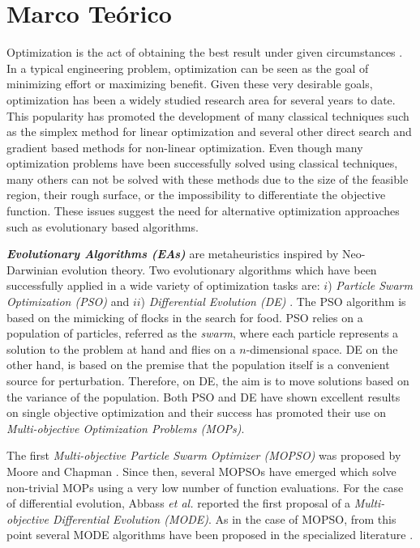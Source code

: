 \chapter{Marco Teórico}

Optimization is the act of obtaining the best result under given circumstances \cite{Rao2009}. In a typical engineering problem, optimization can be seen as the goal of minimizing effort or maximizing benefit. Given these very desirable goals, optimization has been a widely studied research area for several years to date. This popularity has promoted the development of many classical techniques such as the simplex method for linear optimization and several other direct search and gradient based methods for non-linear optimization. Even though many optimization problems have been successfully solved using classical techniques, many others can not be solved with these methods due to the size of the feasible region, their rough surface, or the impossibility to differentiate the objective function. These issues suggest the need for alternative optimization approaches such as evolutionary based algorithms. 


\textbf{\emph{Evolutionary Algorithms (EAs)}} are metaheuristics inspired by Neo-Darwinian evolution theory. Two evolutionary algorithms which have been successfully applied in a wide variety of optimization tasks are: $i$) \emph{Particle Swarm Optimization (PSO)} \cite{Kennedy1995} and $ii$) \emph{Differential Evolution (DE)} \cite{Price1997}. The PSO algorithm is based on the mimicking of flocks in the search for food. PSO relies on a population of particles, referred as the \emph{swarm}, where each particle represents a solution to the problem at hand and flies on a $n$-dimensional space. DE on the other hand, is based on the premise that the population itself is a convenient source for perturbation. Therefore, on DE, the aim is to move solutions based on the variance of the population.  Both PSO and DE have shown excellent results on single objective optimization and their success has promoted their use on \emph{Multi-objective Optimization Problems (MOPs)}.

The first \emph{Multi-objective Particle Swarm Optimizer (MOPSO)} was proposed by Moore and Chapman \cite{Moore99}. Since then, several MOPSOs \cite{Reyes06,Toscano05,Branke06,Coello04} have emerged which solve non-trivial MOPs using a very low number of function evaluations. For the case of differential evolution, Abbass \emph{et al.} \cite{Abbass01} reported the first proposal of a \emph{Multi-objective Differential Evolution (MODE)}. As in the case of MOPSO, from this point several MODE algorithms have been proposed in the specialized literature \cite{Robic05,Santana05,Xue03}.


